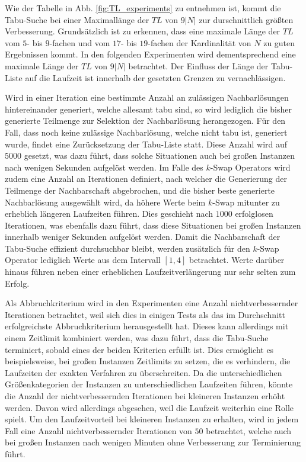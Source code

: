 Wie der Tabelle in Abb. \ref{fig:TL_experiments} zu entnehmen ist, kommt die Tabu-Suche bei einer Maximallänge der $TL$
von $9|N|$ zur durschnittlich größten Verbesserung. Grundsätzlich ist zu erkennen, dass eine maximale Länge der $TL$
vom $5$- bis $9$-fachen und vom $17$- bis $19$-fachen der Kardinalität von $N$ zu guten Ergebnissen kommt.
In den folgenden Experimenten wird dementsprechend eine maximale Länge der $TL$ von $9|N|$ betrachtet. Der Einfluss der Länge der Tabu-Liste auf die Laufzeit ist innerhalb der gesetzten Grenzen zu vernachlässigen.

Wird in einer Iteration eine bestimmte Anzahl an zulässigen Nachbarlösungen hintereinander generiert, welche allesamt
tabu sind, so wird lediglich die bisher generierte Teilmenge zur Selektion der Nachbarlösung herangezogen.
Für den Fall, dass noch keine zulässige Nachbarlösung, welche nicht tabu ist, generiert wurde, findet eine
Zurücksetzung der Tabu-Liste statt. Diese Anzahl wird auf $5000$ gesetzt, was dazu führt, dass solche
Situationen auch bei großen Instanzen nach wenigen Sekunden aufgelöst werden.
Im Falle des $k$-Swap Operators wird zudem eine Anzahl an Iterationen definiert, nach welcher die Generierung der Teilmenge der Nachbarschaft abgebrochen, und die bisher beste generierte Nachbarlösung ausgewählt wird,
da höhere Werte beim $k$-Swap mitunter zu erheblich längeren Laufzeiten führen. Dies geschieht nach $1000$
erfolglosen Iterationen, was ebenfalls dazu führt, dass diese Situationen bei großen Instanzen
innerhalb weniger Sekunden aufgelöst werden.
Damit die Nachbarschaft der Tabu-Suche effizient durchsuchbar bleibt, werden zusätzlich für den $k$-Swap Operator lediglich Werte aus dem Intervall $[1, 4]$ betrachtet. Werte darüber hinaus führen
neben einer erheblichen Laufzeitverlängerung nur sehr selten zum Erfolg.

Als Abbruchkriterium wird in den Experimenten eine Anzahl nichtverbessernder Iterationen betrachtet,
weil sich dies in einigen Tests als das im Durchschnitt erfolgreichste Abbruchkriterium herausgestellt hat.
Dieses kann allerdings mit einem Zeitlimit kombiniert werden, was dazu führt, dass die Tabu-Suche terminiert,
sobald eines der beiden Kriterien erfüllt ist. Dies ermöglicht es beispielsweise, bei großen Instanzen
Zeitlimits zu setzen, die es verhindern, die Laufzeiten der exakten Verfahren zu überschreiten.
Da die unterschiedlichen Größenkategorien der Instanzen zu unterschiedlichen Laufzeiten
führen, könnte die Anzahl der nichtverbessernden Iterationen bei kleineren Instanzen erhöht werden.
Davon wird allerdings abgesehen, weil die Laufzeit weiterhin eine Rolle spielt. Um den Laufzeitvorteil bei
kleineren Instanzen zu erhalten, wird in jedem Fall eine Anzahl nichtverbessernder Iterationen von $50$ betrachtet,
welche auch bei großen Instanzen nach wenigen Minuten ohne Verbesserung zur Terminierung führt.

